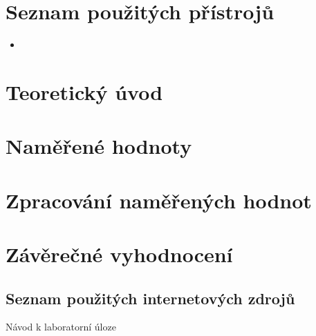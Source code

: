 \documentclass[a4paper,12pt]{article}   %
\begin{document}
\section{Seznam použitých přístrojů}
\begin{itemize}
    \item 
\end{itemize}

\section{Teoretický úvod}



\section{Naměřené hodnoty}



\section{Zpracování naměřených hodnot}


\section{Závěrečné vyhodnocení}



\clearpage
\renewcommand{\refname}{Seznam použité literatury a~zdrojů informací} 

\begin{thebibliography}{99}

\subsection*{Seznam použitých internetových zdrojů}
     Návod k laboratorní úloze
    
\end{thebibliography}
\end{document}
